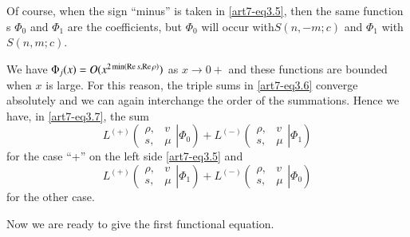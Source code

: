 Of course, when the sign ``minus'' is taken in \eqref{art7-eq3.5}, then the same function s $\Phi_0$ and $\Phi_1$ are the coefficients, but $\Phi_0$ will occur with\break $S(n,-m;c)$ and $\Phi_1$ with $S (n, m;c)$.

We have $\Phi_j(x) = O (x^{2 \min (\operatorname{Re} s, \operatorname{Re} \rho)})$ as $x \to 0 + $ and these functions are bounded when $x$ is large. For this reason, the triple sums in \eqref{art7-eq3.6} converge absolutely and we can again interchange the order of the summations. Hence we have, in \eqref{art7-eq3.7}, the sum 
\begin{equation}
L^{(+)}
\left( 
\left. 
\begin{matrix}
\rho, & v\\
s, & \mu
\end{matrix}
\right| \Phi_0 
\right) + L^{(-)}
\left( 
\left. 
\begin{matrix}
\rho, & v\\
s, & \mu
\end{matrix}
\right| \Phi_1 
\right)\label{art7-eq3.9}
\end{equation}
for the case ``+'' on the left side \eqref{art7-eq3.5} and 
\begin{equation}
L^{(+)}
\left( 
\left. 
\begin{matrix}
\rho, & v\\
s, & \mu
\end{matrix}
\right| \Phi_1 
\right) + L^{(-)}
\left( 
\left. 
\begin{matrix}
\rho, & v\\
s, & \mu
\end{matrix}
\right| \Phi_0 
\right)
\label{art7-eq3.10}
\end{equation}\pageoriginale
for the other case.

Now we are ready to give the first functional equation.

